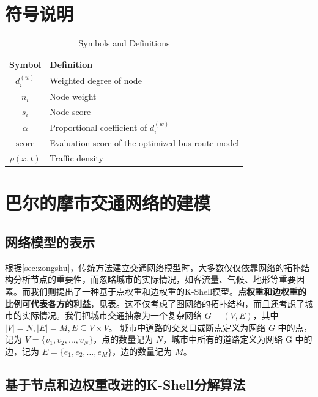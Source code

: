 \documentclass[12pt, a4paper, oneside]{ctexart}
\begin{document}
\section{符号说明}

\begin{table}[H]
  \centering
  \caption{Symbols and Definitions}
  \label{tab:symbols}
  \begin{tabular}{cl}
    \toprule
    \textbf{Symbol}      & \textbf{Definition} \\
    \midrule
    $d_i^{(w)}$          & Weighted degree of node \\
    $n_i$                & Node weight \\
    $s_i$                & Node score \\
    $\alpha$             & Proportional coefficient of $d_i^{(w)}$ \\
    $\mathrm{score}$     & Evaluation score of the optimized bus route model \\
    $\rho(x,t)$          & Traffic density \\
    \bottomrule
  \end{tabular}
\end{table}

\section{巴尔的摩市交通网络的建模}

\subsection{网络模型的表示}

根据\ref{sec:zongshu}，传统方法建立交通网络模型时，大多数仅仅依靠网络的拓扑结构分析节点的重要性，而忽略城市的实际情况，如客流量、气候、地形等重要因素。而我们则提出了一种基于点权重和边权重的K-Shell模型。\textbf{点权重和边权重的比例可代表各方的利益}，见表。这不仅考虑了图网络的拓扑结构，而且还考虑了城市的实际情况。我们把城市交通抽象为一个复杂网络 \(G=(V,E)\)，其中 \(|V|=N, |E|=M,E\subseteq V\times V\)。
城市中道路的交叉口或断点定义为网络 \(G\) 中的点，记为 \(V=\{v_1, v_2, \ldots, v_N\}\)，点的数量记为 \(N\)，城市中所有的道路定义为网络 G 中的边，记为 \(E= \{e_1, e_2, \ldots, e_M\}\)，边的数量记为 \(M\)。

\subsection{基于节点和边权重改进的K-Shell分解算法}
\label{sec:improvedKshell}
\end{document}
